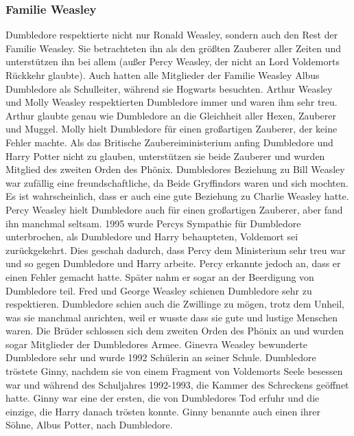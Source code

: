 \documentclass[a4paper, 10pt]{article}
\begin{document}
\subsubsection*{\large Familie Weasley}
Dumbledore respektierte nicht nur Ronald Weasley, sondern auch den Rest der Familie Weasley. Sie betrachteten ihn als den größten Zauberer aller Zeiten und unterstützen ihn bei allem (außer Percy Weasley, der nicht an Lord Voldemorts Rückkehr glaubte). Auch hatten alle Mitglieder der Familie Weasley Albus Dumbledore als Schulleiter, während sie Hogwarts besuchten.
\vspace{10pt}
\newline
{}  
Arthur Weasley und Molly Weasley respektierten Dumbledore immer und waren ihm sehr treu. Arthur glaubte genau wie Dumbledore an die Gleichheit aller Hexen, Zauberer und Muggel. Molly hielt Dumbledore für einen großartigen Zauberer, der keine Fehler machte. Als das Britische Zaubereiministerium anfing Dumbledore und Harry Potter nicht zu glauben, unterstützen sie beide Zauberer und wurden Mitglied des zweiten Orden des Phönix.
\vspace{10pt}
\newline
{}  
Dumbledores Beziehung zu Bill Weasley war zufällig eine freundschaftliche, da Beide Gryffindors waren und sich mochten. Es ist wahrscheinlich, dass er auch eine gute Beziehung zu Charlie Weasley hatte.
\vspace{10pt}
\newline
{}  
Percy Weasley hielt Dumbledore auch für einen großartigen Zauberer, aber fand ihn manchmal seltsam. 1995 wurde Percys Sympathie für Dumbledore unterbrochen, als Dumbledore und Harry behaupteten, Voldemort sei zurückgekehrt. Dies geschah dadurch, dass Percy dem Ministerium sehr treu war und so gegen Dumbledore und Harry arbeite. Percy erkannte jedoch an, dass er einen Fehler gemacht hatte. Später nahm er sogar an der Beerdigung von Dumbledore teil.
\vspace{10pt}
\newline
{}  
Fred und George Weasley schienen Dumbledore sehr zu respektieren. Dumbledore schien auch die Zwillinge zu mögen, trotz dem Unheil, was sie manchmal anrichten, weil er wusste dass sie gute und lustige Menschen waren. Die Brüder schlossen sich dem zweiten Orden des Phönix an und wurden sogar Mitglieder der Dumbledores Armee.
\vspace{10pt}
\newline
{}  
Ginevra Weasley bewunderte Dumbledore sehr und wurde 1992 Schülerin an seiner Schule. Dumbledore tröstete Ginny, nachdem sie von einem Fragment von Voldemorts Seele besessen war und während des Schuljahres 1992-1993, die Kammer des Schreckens geöffnet hatte. Ginny war eine der ersten, die von Dumbledores Tod erfuhr und die einzige, die Harry danach trösten konnte. Ginny benannte auch einen ihrer Söhne, Albus Potter, nach Dumbledore.
\end{document}
